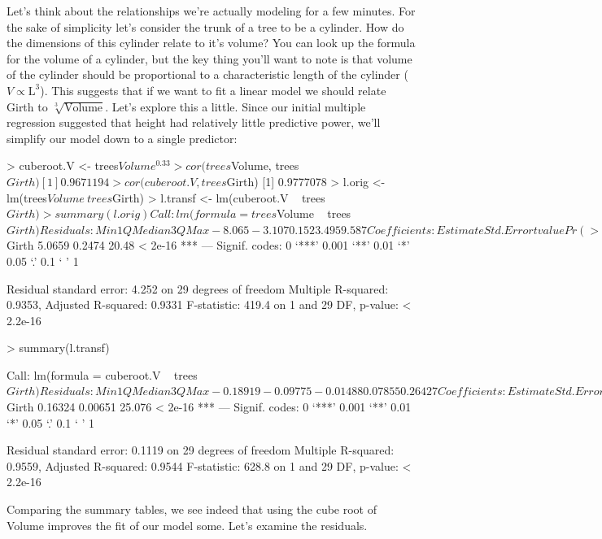 Let's think about the relationships we're actually modeling for a few minutes.  For the sake of simplicity let's consider the trunk of a tree to be a cylinder.  How do the dimensions of this cylinder relate to it's volume? You can look up the formula for the volume of a cylinder, but the key thing you'll want to note is that volume of the cylinder should be proportional to a characteristic  length of the cylinder  ($V \propto \mathrm{L}^3$). This suggests that if we want to fit a linear model we should relate Girth to $\sqrt[3]{\mathrm{Volume}}$. Let's explore this a little. Since our initial multiple regression suggested that height had relatively little predictive power, we'll simplify our model down to a single predictor:
%
\begin{R}
> cuberoot.V <- trees$Volume^0.33
> cor(trees$Volume, trees$Girth)
[1] 0.9671194
> cor(cuberoot.V, trees$Girth)
[1] 0.9777078
> l.orig <- lm(trees$Volume~ trees$Girth)
> l.transf <- lm(cuberoot.V ~ trees$Girth)
> summary(l.orig)

Call:
lm(formula = trees$Volume ~ trees$Girth)

Residuals:
   Min     1Q Median     3Q    Max
-8.065 -3.107  0.152  3.495  9.587

Coefficients:
            Estimate Std. Error t value Pr(>|t|)
(Intercept) -36.9435     3.3651  -10.98 7.62e-12 ***
trees$Girth   5.0659     0.2474   20.48  < 2e-16 ***
---
Signif. codes:  0 ‘***’ 0.001 ‘**’ 0.01 ‘*’ 0.05 ‘.’ 0.1 ‘ ’ 1

Residual standard error: 4.252 on 29 degrees of freedom
Multiple R-squared: 0.9353, Adjusted R-squared: 0.9331
F-statistic: 419.4 on 1 and 29 DF,  p-value: < 2.2e-16

> summary(l.transf)

Call:
lm(formula = cuberoot.V ~ trees$Girth)

Residuals:
     Min       1Q   Median       3Q      Max
-0.18919 -0.09775 -0.01488  0.07855  0.26427

Coefficients:
            Estimate Std. Error t value Pr(>|t|)
(Intercept)  0.82543    0.08856   9.321 3.18e-10 ***
trees$Girth  0.16324    0.00651  25.076  < 2e-16 ***
---
Signif. codes:  0 ‘***’ 0.001 ‘**’ 0.01 ‘*’ 0.05 ‘.’ 0.1 ‘ ’ 1

Residual standard error: 0.1119 on 29 degrees of freedom
Multiple R-squared: 0.9559, Adjusted R-squared: 0.9544
F-statistic: 628.8 on 1 and 29 DF,  p-value: < 2.2e-16
\end{R}
%
Comparing the summary tables, we see indeed that using the cube root of Volume improves the fit of our model some. Let's examine the residuals.
